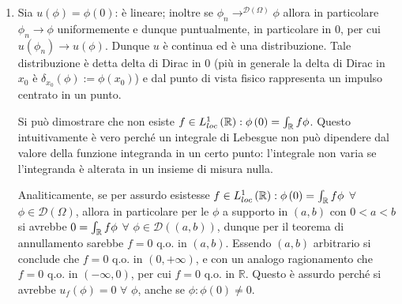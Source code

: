 \documentclass{article}
\begin{document}
\begin{enumerate}
\item Sia $u\left( \phi \right) =\phi \left( 0\right) $: \`{e} lineare;
inoltre se $\phi _{n}\rightarrow ^{\mathcal{D}\left( \Omega \right) }\phi $
allora in particolare $\phi _{n}\rightarrow \phi $ uniformemente e dunque
puntualmente, in particolare in $0$, per cui $u\left( \phi _{n}\right)
\rightarrow u\left( \phi \right) $. Dunque $u$ \`{e} continua ed \`{e} una
distribuzione. Tale distribuzione \`{e} detta delta di Dirac in $0$ (pi\`{u}
in generale la delta di Dirac in $x_{0}$ \`{e} $\delta _{x_{0}}\left( \phi
\right) :=\phi \left( x_{0}\right) $) e dal punto di vista fisico
rappresenta un impulso centrato in un punto.

Si pu\`{o} dimostrare che non esiste $f\in L_{loc}^{1}\left( 
\mathbb{R}
\right) :\phi \left( 0\right) =\int_{%
\mathbb{R}
}f\phi $. Questo intuitivamente \`{e} vero perch\'{e} un integrale di
Lebesgue non pu\`{o} dipendere dal valore della funzione integranda in un
certo punto: l'integrale non varia se l'integranda \`{e} alterata in un
insieme di misura nulla.

Analiticamente, se per assurdo esistesse $f\in L_{loc}^{1}\left( 
\mathbb{R}
\right) :\phi \left( 0\right) =\int_{%
\mathbb{R}
}f\phi $ $\forall $ $\phi \in \mathcal{D}\left( \Omega \right) $, allora in
particolare per le $\phi $ a supporto in $\left( a,b\right) $ con $0<a<b$ si
avrebbe $0=\int_{%
\mathbb{R}
}f\phi $ $\forall $ $\phi \in \mathcal{D}\left( \left( a,b\right) \right) $,
dunque per il teorema di annullamento sarebbe $f=0$ q.o. in $\left(
a,b\right) $. Essendo $\left( a,b\right) $ arbitrario si conclude che $f=0$
q.o. in $\left( 0,+\infty \right) $, e con un analogo ragionamento che $f=0$
q.o. in $\left( -\infty ,0\right) $, per cui $f=0$ q.o. in $%
\mathbb{R}
$. Questo \`{e} assurdo perch\'{e} si avrebbe $u_{f}\left( \phi \right) =0$ $%
\forall $ $\phi $, anche se $\phi :\phi \left( 0\right) \neq 0$.


\end{enumerate}
\end{document}
